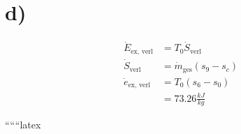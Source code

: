 

\section*{d)}
\begin{align*}
\dot{E}_{\text{ex, verl}} &= T_0 \dot{S}_{\text{verl}} \\
\dot{S}_{\text{verl}} &= \dot{m}_{\text{ges}} (s_9 - s_c) \\
\dot{e}_{\text{ex, verl}} &= T_0 (s_6 - s_0) \\
&= 73.26 \frac{kJ}{kg}
\end{align*}

``````latex